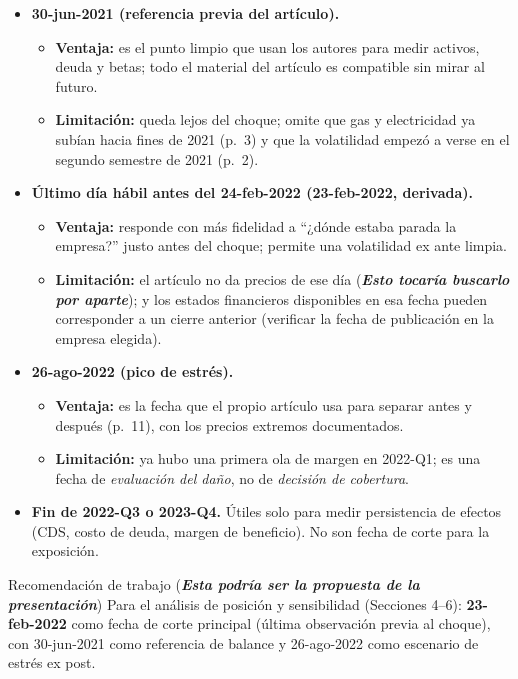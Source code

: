 \documentclass{article} %
\newcommand{\pg}[1]{(p.~#1)}
\begin{document}
    \begin{itemize}
        \item \textbf{30-jun-2021 (referencia previa del artículo).} 
        \begin{itemize}
            \item \textbf{Ventaja:} es el punto limpio que usan los autores para medir activos, deuda y betas; todo el material del artículo es compatible sin mirar al futuro. 
            \item \textbf{Limitación:} queda lejos del choque; omite que gas y electricidad ya subían hacia fines de 2021 \pg{3} y que la volatilidad empezó a verse en el segundo semestre de 2021 \pg{2}.
        \end{itemize}
        \item \textbf{Último día hábil antes del 24-feb-2022 (23-feb-2022, derivada).} 
        \begin{itemize}
            \item \textbf{Ventaja:} responde con más fidelidad a ``¿dónde estaba parada la empresa?'' justo antes del choque; permite una volatilidad ex ante limpia. 
            \item \textbf{Limitación:} el artículo no da precios de ese día (\textit{\textbf{Esto tocaría buscarlo por aparte}}); y los estados financieros disponibles en esa fecha pueden corresponder a un cierre anterior (verificar la fecha de publicación en la empresa elegida).
        \end{itemize}
        \item \textbf{26-ago-2022 (pico de estrés).} 
        \begin{itemize}
            \item \textbf{Ventaja:} es la fecha que el propio artículo usa para separar antes y después \pg{11}, con los precios extremos documentados.
            \item \textbf{Limitación:} ya hubo una primera ola de margen en 2022-Q1; es una fecha de \emph{evaluación del daño}, no de \emph{decisión de cobertura}.
        \end{itemize}
        \item \textbf{Fin de 2022-Q3 o 2023-Q4.} Útiles solo para medir persistencia de efectos (CDS, costo de deuda, margen de beneficio). No son fecha de corte para la exposición.
    \end{itemize}

    \begin{nota}{Recomendación de trabajo (\textit{\textbf{Esta podría ser la propuesta de la presentación}})}
        Para el análisis de posición y sensibilidad (Secciones 4--6): 
        \textbf{23-feb-2022} como fecha de corte principal (última observación previa al choque), 
        con 30-jun-2021 como referencia de balance y 26-ago-2022 como escenario de estrés ex post. 
    \end{nota}
\end{document}
